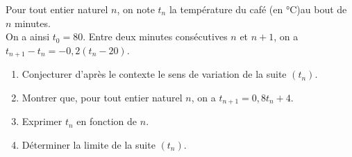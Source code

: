 \documentclass[a4paper,11pt,exos]{nsi} %
\begin{document}
Pour tout entier naturel $n$, on note $t_n$ la température du café (en °C)au bout de $n$ minutes.\\
On a ainsi $t_0=80$. Entre deux minutes consécutives $n$ et $n+1$, on a $t_{n+1}-t_n=-0,2(t_n-20)$.
\begin{enumerate}
    \item Conjecturer d'après le contexte le sens de variation de la suite $(t_n)$.
    \item Montrer que, pour tout entier naturel $n$, on a $t_{n+1}=0,8t_n+4$.
    \item Exprimer $t_n$ en fonction de $n$.
    \item Déterminer la limite de la suite $(t_n)$.
\end{enumerate}
\end{document}
